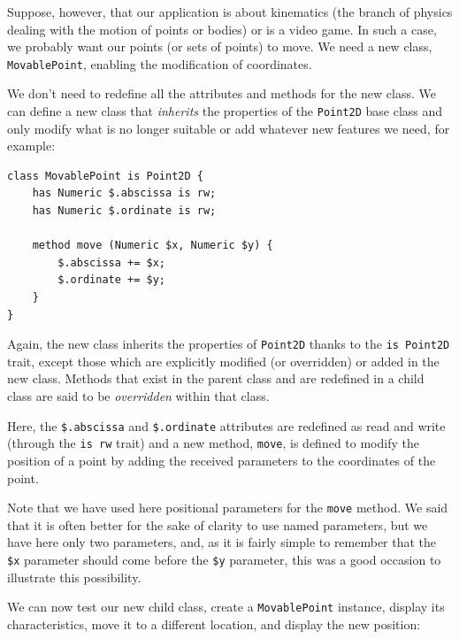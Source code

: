 Suppose, however, that our application is about kinematics 
(the branch of physics dealing with the motion of points or 
bodies) or is a video game. In such a case, we probably want 
our points (or sets of points) to move. We need a new class, 
{\tt MovablePoint}, enabling the modification of coordinates.

We don't need to redefine all the attributes and methods for 
the new class. We can define a new class that 
\emph{inherits} the properties of the {\tt Point2D} base class 
and only modify what is no longer suitable or add whatever 
new features we need, for example:

\begin{verbatim}
class MovablePoint is Point2D {
    has Numeric $.abscissa is rw;
    has Numeric $.ordinate is rw;
    
    method move (Numeric $x, Numeric $y) {
        $.abscissa += $x;
        $.ordinate += $y;
    }
}
\end{verbatim}

Again, the new class inherits the properties of {\tt Point2D} thanks 
to the {\tt is Point2D} trait, except those which are explicitly 
modified (or overridden) or added in the new class. 
Methods that exist in the parent class and are 
redefined in a child class are said to be \emph{overridden} 
within that class. 

Here, the \verb'$.abscissa' and \verb'$.ordinate' attributes are 
redefined as read and write (through the {\tt is rw} trait) and 
a new method, {\tt move}, is defined to modify the position of 
a point by adding the received parameters to the coordinates 
of the point.

Note that we have used here positional parameters for the 
{\tt move} method. We said that it is often better for the sake of clarity 
to use named parameters, but we have here only two parameters, 
and, as it is fairly simple to remember that the \verb'$x' 
parameter should come before the \verb'$y' parameter, this 
was a good occasion to illustrate this possibility.

We can now test our new child class, create a {\tt MovablePoint} 
instance, display its characteristics, move it to a different 
location, and display the new position:

